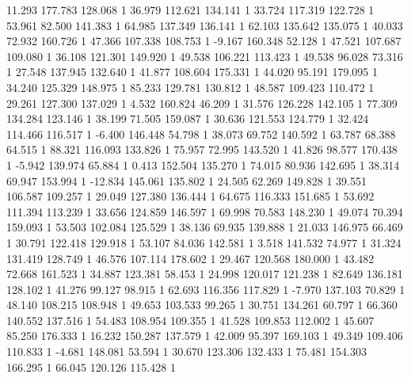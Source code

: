 	11.293 177.783 128.068 1
	36.979 112.621 134.141 1
	33.724 117.319 122.728 1
	53.961 82.500 141.383 1
	64.985 137.349 136.141 1
	62.103 135.642 135.075 1
	40.033 72.932 160.726 1
	47.366 107.338 108.753 1
	-9.167 160.348 52.128 1
	47.521 107.687 109.080 1
	36.108 121.301 149.920 1
	49.538 106.221 113.423 1
	49.538 96.028 73.316 1
	27.548 137.945 132.640 1
	41.877 108.604 175.331 1
	44.020 95.191 179.095 1
	34.240 125.329 148.975 1
	85.233 129.781 130.812 1
	48.587 109.423 110.472 1
	29.261 127.300 137.029 1
	4.532 160.824 46.209 1
	31.576 126.228 142.105 1
	77.309 134.284 123.146 1
	38.199 71.505 159.087 1
	30.636 121.553 124.779 1
	32.424 114.466 116.517 1
	-6.400 146.448 54.798 1
	38.073 69.752 140.592 1
	63.787 68.388 64.515 1
	88.321 116.093 133.826 1
	75.957 72.995 143.520 1
	41.826 98.577 170.438 1
	-5.942 139.974 65.884 1
	0.413 152.504 135.270 1
	74.015 80.936 142.695 1
	38.314 69.947 153.994 1
	-12.834 145.061 135.802 1
	24.505 62.269 149.828 1
	39.551 106.587 109.257 1
	29.049 127.380 136.444 1
	64.675 116.333 151.685 1
	53.692 111.394 113.239 1
	33.656 124.859 146.597 1
	69.998 70.583 148.230 1
	49.074 70.394 159.093 1
	53.503 102.084 125.529 1
	38.136 69.935 139.888 1
	21.033 146.975 66.469 1
	30.791 122.418 129.918 1
	53.107 84.036 142.581 1
	3.518 141.532 74.977 1
	31.324 131.419 128.749 1
	46.576 107.114 178.602 1
	29.467 120.568 180.000 1
	43.482 72.668 161.523 1
	34.887 123.381 58.453 1
	24.998 120.017 121.238 1
	82.649 136.181 128.102 1
	41.276 99.127 98.915 1
	62.693 116.356 117.829 1
	-7.970 137.103 70.829 1
	48.140 108.215 108.948 1
	49.653 103.533 99.265 1
	30.751 134.261 60.797 1
	66.360 140.552 137.516 1
	54.483 108.954 109.355 1
	41.528 109.853 112.002 1
	45.607 85.250 176.333 1
	16.232 150.287 137.579 1
	42.009 95.397 169.103 1
	49.349 109.406 110.833 1
	-4.681 148.081 53.594 1
	30.670 123.306 132.433 1
	75.481 154.303 166.295 1
	66.045 120.126 115.428 1
